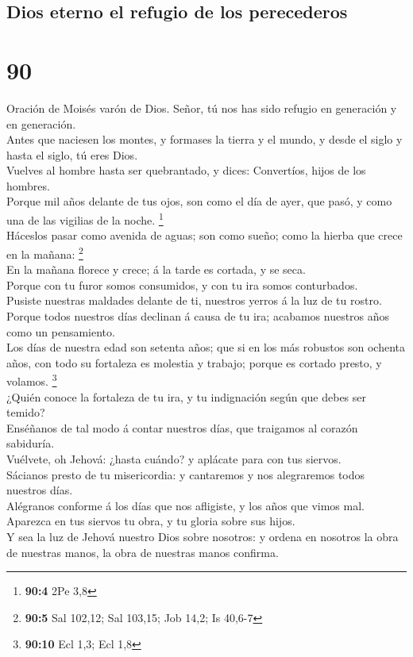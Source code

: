 \hypertarget{dios-eterno-el-refugio-de-los-perecederos}{%
\subsection{Dios eterno el refugio de los
perecederos}\label{dios-eterno-el-refugio-de-los-perecederos}}

\hypertarget{section-89}{%
\section{90}\label{section-89}}

 Oración de Moisés varón de Dios. Señor, tú nos has sido
refugio en generación y en generación.\\
 Antes que naciesen los montes, y formases la tierra y el
mundo, y desde el siglo y hasta el siglo, tú eres Dios.\\
 Vuelves al hombre hasta ser quebrantado, y dices:
Convertíos, hijos de los hombres.\\
 Porque mil años delante de tus ojos, son como el día de
ayer, que pasó, y como una de las vigilias de la noche. \footnote{\textbf{90:4}
  2Pe 3,8}\\
 Háceslos pasar como avenida de aguas; son como sueño; como
la hierba que crece en la mañana: \footnote{\textbf{90:5} Sal 102,12;
  Sal 103,15; Job 14,2; Is 40,6-7}\\
 En la mañana florece y crece; á la tarde es cortada, y se
seca.\\
 Porque con tu furor somos consumidos, y con tu ira somos
conturbados.\\
 Pusiste nuestras maldades delante de ti, nuestros yerros á
la luz de tu rostro.\\
 Porque todos nuestros días declinan á causa de tu ira;
acabamos nuestros años como un pensamiento.\\
 Los días de nuestra edad son setenta años; que si en los
más robustos son ochenta años, con todo su fortaleza es molestia y
trabajo; porque es cortado presto, y volamos. \footnote{\textbf{90:10}
  Ecl 1,3; Ecl 1,8}\\
 ¿Quién conoce la fortaleza de tu ira, y tu indignación
según que debes ser temido?\\
 Enséñanos de tal modo á contar nuestros días, que
traigamos al corazón sabiduría.\\
 Vuélvete, oh Jehová: ¿hasta cuándo? y aplácate para con
tus siervos.\\
 Sácianos presto de tu misericordia: y cantaremos y nos
alegraremos todos nuestros días.\\
 Alégranos conforme á los días que nos afligiste, y los
años que vimos mal.\\
 Aparezca en tus siervos tu obra, y tu gloria sobre sus
hijos.\\
 Y sea la luz de Jehová nuestro Dios sobre nosotros: y
ordena en nosotros la obra de nuestras manos, la obra de nuestras manos
confirma.

